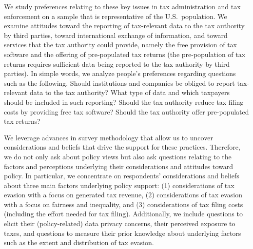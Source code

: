 \documentclass[12pt]{article}
\begin{document}
We study preferences relating to these key issues in tax administration and tax enforcement on a sample that is representative of the U.S.\ population. We examine attitudes toward the reporting of tax-relevant data to the tax authority by third parties, toward international exchange of information, and toward services that the tax authority could provide, namely the free provision of tax software and the offering of pre-populated tax returns (the pre-population of tax returns requires sufficient data being reported to the tax authority by third parties). In simple words, we analyze people's preferences regarding questions such as the following. Should institutions and companies be obliged to report tax-relevant data to the tax authority? What type of data and which taxpayers should be included in such reporting? Should the tax authority reduce tax filing costs by providing free tax software? Should the tax authority offer pre-populated tax returns?

We leverage advances in survey methodology that allow us to uncover considerations and beliefs that drive the support for these practices. Therefore, we do not only ask about policy views but also ask questions relating to the factors and perceptions underlying their considerations and attitudes toward policy. In particular, we concentrate on respondents' considerations and beliefs about three main factors underlying policy support: (1) considerations of tax evasion with a focus on generated tax revenue, (2) considerations of tax evasion with a focus on fairness and inequality, and (3) considerations of tax filing costs (including the effort needed for tax filing). Additionally, we include questions to elicit their (policy-related) data privacy concerns, their perceived exposure to taxes, and questions to measure their prior knowledge about underlying factors such as the extent and distribution of tax evasion. 

\end{document}
